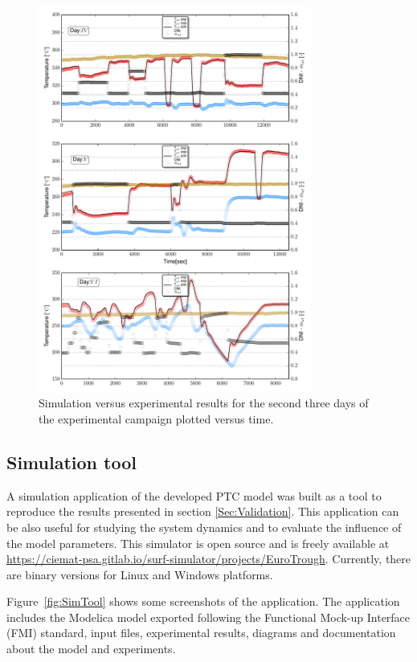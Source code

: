 \documentclass[final,3p,times,review]{elsarticle}
\begin{document}
\begin{figure}[h!]
	\centering
	\includegraphics[width=0.8\textwidth]{Figures/_SecondThreeDays.pdf}
	\caption{Simulation versus experimental results for  the second three days of the experimental campaign plotted versus time. }
	\label{fig:SF_ModRes_Second3Days}
\end{figure}
%
\clearpage
%
\subsection{Simulation tool} \label{Sec:SimTool}
%
A simulation application of the developed PTC model was built as a tool to reproduce the results presented in section \ref{Sec:Validation}. This application can be also useful for studying the system dynamics and to evaluate the influence of the model parameters. This simulator is open source and is freely available at \url{https://ciemat-psa.gitlab.io/surf-simulator/projects/EuroTrough}. Currently, there are binary versions for Linux and Windows platforms.

Figure~\ref{fig:SimTool} shows some screenshots of the application. The application includes the Modelica model exported following the Functional Mock-up Interface (FMI) standard, input files, experimental results, diagrams and documentation about the model and experiments.
\end{document}
